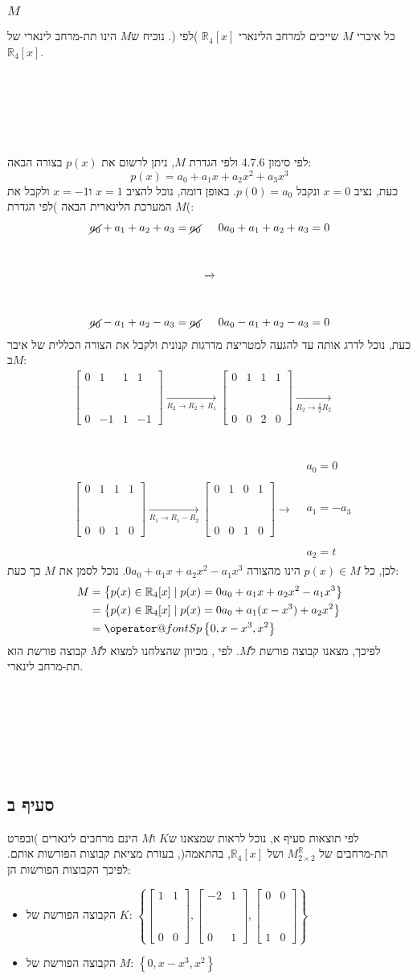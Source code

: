 \documentclass[11pt, oneside]{article}
\makeatletter
\newcommand{\qed}{\R{$\blacksquare$}}
\newcommand{\br}{\\\\\\\\\\\\\\}
\newcommand{\opr}[1]{\xrightarrow[\text{#1}]{}}
\newcommand{\mR}{\mathbb{R}}
\newcommand{\q}[3]{\R{שאלה #3#2.#1}}
\newcommand{\m}[3]{\R{משפט #3#2.#1}}
\newcommand{\Sp}[1]{\mathop{\operator@font Sp}#1}
\newcommand{\tot}[4]{\begin{bmatrix}#1 & #2\br#3 & #4\end{bmatrix}}
\newcommand{\poreset}[2]{\item{הקבוצה הפורשת של $#1$: $#2$}}
\makeatother
\begin{document}
\subsubsection{$M$}
כל איברי $M$ שייכים למרחב הלינארי $\mR_4[x]$ )לפי \q{7}{1}{9.}(. נוכיח ש$M$ הינו תת-מרחב לינארי של $\mR_4[x]$.
\br
לפי סימון 4.7.6 ולפי הגדרת $M$, ניתן לרשום את $p(x)$ בצורה הבאה:
$$p(x) = a_0 + a_1x + a_2x^2 + a_3x^3$$
כעת, נציב $x = 0$ ונקבל $p(0) = a_0$. באופן דומה, נוכל להציב $x = 1$ ו$x = -1$ ולקבל את המערכת הלינארית הבאה )לפי הגדרת $M$(:
\begin{eqnarray*}
\begin{matrix}
\cancel{a_0} + a_1 + a_2 + a_3 = \cancel{a_0}\br
\cancel{a_0} - a_1 + a_2 - a_3 = \cancel{a_0}
\end{matrix}
\opr{}
\begin{matrix}
0a_0 + a_1 + a_2 + a_3 = 0\br
0a_0 - a_1 + a_2 - a_3 = 0
\end{matrix}
\end{eqnarray*}
\clearpage
כעת, נוכל לדרג אותה עד להגעה למטריצת מדרגות קנונית ולקבל את הצורה הכללית של איבר ב$M$:
\begin{align*}
& \begin{bmatrix}
0 & 1 & 1 & 1\br
0 & -1 & 1 & -1
\end{bmatrix}
\opr{$R_2 \opr{} R_2 + R_1$}
\begin{bmatrix}
0 & 1 & 1 & 1\br
0 & 0 & 2 & 0
\end{bmatrix}
\opr{$R_2 \opr{} \frac{1}{2}R_2$}\br
& \begin{bmatrix}
0 & 1 & 1 & 1\br
0 & 0 & 1 & 0
\end{bmatrix}
\opr{$R_1 \opr{} R_1 - R_2$}
\begin{bmatrix}
0 & 1 & 0 & 1\br
0 & 0 & 1 & 0
\end{bmatrix}
\opr{}
\begin{matrix}
& a_0 = 0\br
& a_1 = -a_3\br
& a_2 = t
\end{matrix}
\end{align*}
לכן, כל $p(x) \in M$ הינו מהצורה $0a_0 + a_1x + a_2x^2 - a_1x^3$. נוכל לסמן את $M$ כך כעת:
\begin{align*}
M
& = \left\{p(x) \in \mR_4[x] \mid p(x) = 0a_0 + a_1x + a_2x^2 - a_1x^3 \right\}\\
& = \left\{p(x) \in \mR_4[x] \mid p(x) = 0a_0 + a_1(x - x^3) + a_2x^2 \right\}\\
& = \Sp\left\{0, x - x^3, x^2\right\}
\end{align*}
לפיכך, מצאנו קבוצה פורשת ל$M$. לפי \m{7}{5}{1.}, מכיוון שהצלחנו למצוא ל$M$ קבוצה פורשת הוא תת-מרחב לינארי.
\br\qed

\subsection{סעיף ב}
לפי תוצאות סעיף א, נוכל לראות שמצאנו ש$K$ ו$M$ הינם מרחבים לינארים )ובפרט תת-מרחבים של $M^\mR_{2\times2}$ ושל $\mR_4[x]$, בהתאמה(, בעזרת מציאת קבוצות הפורשות אותם. לפיכך הקבוצות הפורשות הן:
\begin{itemize}
\poreset{K}{\left\{\tot{1}{1}{0}{0}, \tot{-2}{1}{0}{1}, \tot{0}{0}{1}{0}\right\}}
\poreset{M}{\left\{0, x - x^3, x^2\right\}}
\end{itemize}
\qed
\end{document}
